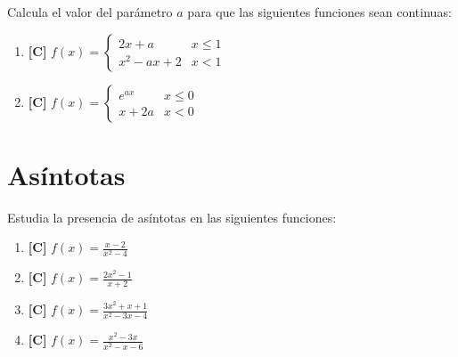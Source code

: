 \Exercicio Calcula el valor del parámetro $a$ para que las siguientes funciones sean continuas:
\begin{enumerate}[topsep=0pt]
	\item \textbf{[C]} $ f(x) = \left\{ \begin{array}{ll}
							 2x+a      &    x \le 1 \\
							 x^2 - ax + 2       &  x < 1
							 \end{array}
		 				\right.$
	\item \textbf{[C]} $ f(x) = \left\{ \begin{array}{ll}
							 e^{ax}      &    x \le 0 \\
							 x+2a        &    x < 0
							 \end{array}
						 \right.$
\end{enumerate}

\section{Asíntotas}

\Exercicio Estudia la presencia de asíntotas en las siguientes funciones:
\begin{enumerate}[topsep=0pt]
	\item \textbf{[C]} $f(x) = \frac{x-2}{x^2-4} $
	\item \textbf{[C]} $f(x) = \frac{2x^2-1}{x+2} $
	\item \textbf{[C]} $f(x) = \frac{3x^2+x+1}{x^2-3x-4}$
	\item \textbf{[C]} $f(x) = \frac{x^2-3x}{x^2-x-6}$
\end{enumerate}
